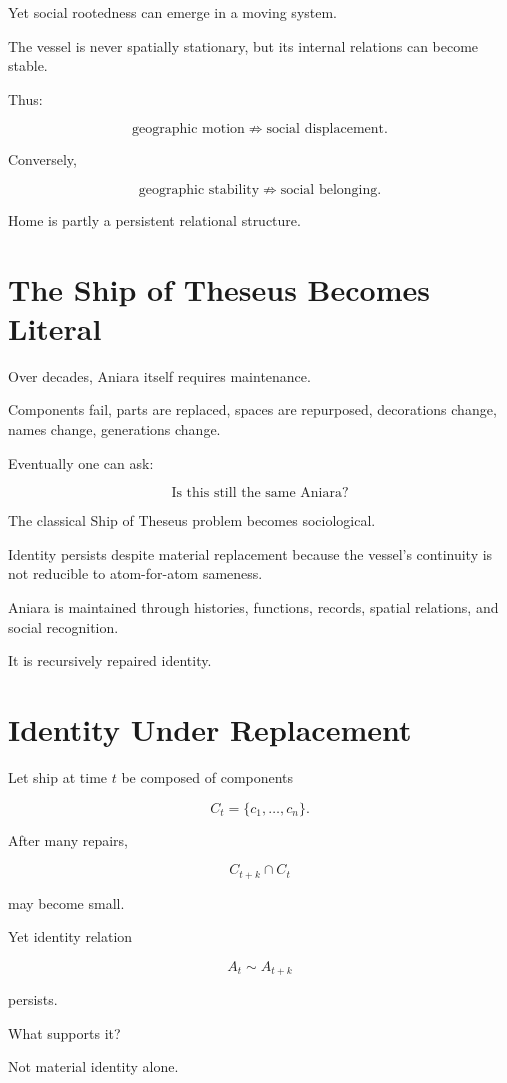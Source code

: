 \documentclass[11pt,oneside]{book}
\theoremstyle{definition}
\theoremstyle{remark}
\begin{document}
Yet social rootedness can emerge in a moving system.

The vessel is never spatially stationary, but its internal relations can become stable.

Thus:

\[
\text{geographic motion}
\not\Rightarrow
\text{social displacement}.
\]

Conversely,

\[
\text{geographic stability}
\not\Rightarrow
\text{social belonging}.
\]

Home is partly a persistent relational structure.

\section{The Ship of Theseus Becomes Literal}

Over decades, Aniara itself requires maintenance.

Components fail, parts are replaced, spaces are repurposed, decorations change, names change, generations change.

Eventually one can ask:

\[
\text{Is this still the same Aniara?}
\]

The classical Ship of Theseus problem becomes sociological.

Identity persists despite material replacement because the vessel's continuity is not reducible to atom-for-atom sameness.

Aniara is maintained through histories, functions, records, spatial relations, and social recognition.

It is recursively repaired identity.

\section{Identity Under Replacement}

Let ship at time \(t\) be composed of components

\[
C_t=\{c_1,\ldots,c_n\}.
\]

After many repairs,

\[
C_{t+k}\cap C_t
\]

may become small.

Yet identity relation

\[
A_t\sim A_{t+k}
\]

persists.

What supports it?

Not material identity alone.
\end{document}
